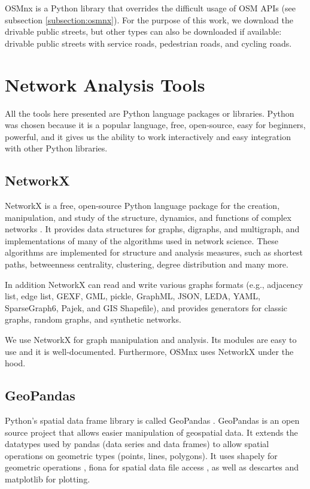 {{OSMnx is a Python library that overrides the difficult usage of OSM APIs (see subsection \ref{subsection:osmnx}). For the purpose of this work, we download the drivable public streets, but other types can also be downloaded if available: drivable public streets with service roads, pedestrian roads, and cycling roads.

\section{Network Analysis Tools}


All the tools here presented are Python language packages or libraries. Python was chosen because it is a popular language, free, open-source, easy for beginners, powerful, and it gives us the ability to work interactively and easy integration with other Python libraries.


\subsection{NetworkX}

NetworkX is a free, open-source Python language package for the creation, manipulation, and study of the structure, dynamics, and functions of complex networks \cite{hagberg-schult-swart-networkx_2008, networkx_doc}. It provides data structures for graphs, digraphs, and multigraph, and implementations of many of the algorithms used in network science. These algorithms are implemented for structure and analysis measures, such as shortest paths, betweenness centrality, clustering, degree distribution and many more.

In addition NetworkX can read and write various graphs formats (e.g., adjacency list, edge list, GEXF, GML, pickle, GraphML, JSON, LEDA, YAML, SparseGraph6, Pajek, and GIS Shapefile), and provides generators for classic graphs, random graphs, and synthetic networks.

We use NetworkX for graph manipulation and analysis. Its modules are easy to use and it is well-documented. Furthermore, OSMnx uses NetworkX under the hood.

\subsection{GeoPandas}

Python's spatial data frame library is called GeoPandas \cite{geopandas}. GeoPandas is an open source project that allows easier manipulation of geospatial data. It extends the datatypes used by pandas (data series and data frames) \cite{pandas, mckinney-proc-scipy-2010} to allow spatial operations on geometric types (points, lines, polygons). It uses shapely for geometric operations \cite{shapely}, fiona for spatial data file access \cite{fiona}, as well as descartes \cite{descartes} and matplotlib \cite{matplotlib, Hunter:2007} for plotting.

}}
